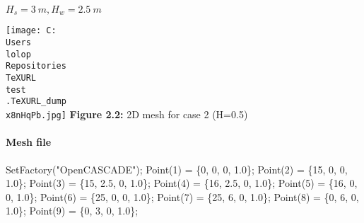 \documentclass[11pt]{article}
\newenvironment{Shaded}{}{}
\newcommand{\DecValTok}[1]{\textcolor[rgb]{0.25,0.63,0.44}{{#1}}}
\newcommand{\FloatTok}[1]{\textcolor[rgb]{0.25,0.63,0.44}{{#1}}}
\newcommand{\StringTok}[1]{\textcolor[rgb]{0.25,0.44,0.63}{{#1}}}
\newcommand{\NormalTok}[1]{{#1}}
\newcommand{\OperatorTok}[1]{\textcolor[rgb]{0.40,0.40,0.40}{{#1}}}
\begin{document}
\(H_s = 3\ m, H_w = 2.5\ m\)

\texttt{[image: C:\\Users\\lolop\\Repositories\\TeXURL\\test\\.TeXURL\_dump\\x8nHqPb.jpg]} \textbf{Figure 2.2:}
2D mesh for case 2 (H=0.5)

\hypertarget{mesh-file-1}{%
\paragraph{Mesh file}\label{mesh-file-1}}

\begin{Shaded}
\begin{Highlighting}[]
\NormalTok{SetFactory}\OperatorTok{(}\StringTok{"OpenCASCADE"}\OperatorTok{);}
\NormalTok{Point}\OperatorTok{(}\DecValTok{1}\OperatorTok{)} \OperatorTok{=} \OperatorTok{\{}\DecValTok{0}\OperatorTok{,} \DecValTok{0}\OperatorTok{,} \DecValTok{0}\OperatorTok{,} \FloatTok{1.0}\OperatorTok{\};}
\NormalTok{Point}\OperatorTok{(}\DecValTok{2}\OperatorTok{)} \OperatorTok{=} \OperatorTok{\{}\DecValTok{15}\OperatorTok{,} \DecValTok{0}\OperatorTok{,} \DecValTok{0}\OperatorTok{,} \FloatTok{1.0}\OperatorTok{\};}
\NormalTok{Point}\OperatorTok{(}\DecValTok{3}\OperatorTok{)} \OperatorTok{=} \OperatorTok{\{}\DecValTok{15}\OperatorTok{,} \FloatTok{2.5}\OperatorTok{,} \DecValTok{0}\OperatorTok{,} \FloatTok{1.0}\OperatorTok{\};}
\NormalTok{Point}\OperatorTok{(}\DecValTok{4}\OperatorTok{)} \OperatorTok{=} \OperatorTok{\{}\DecValTok{16}\OperatorTok{,} \FloatTok{2.5}\OperatorTok{,} \DecValTok{0}\OperatorTok{,} \FloatTok{1.0}\OperatorTok{\};}
\NormalTok{Point}\OperatorTok{(}\DecValTok{5}\OperatorTok{)} \OperatorTok{=} \OperatorTok{\{}\DecValTok{16}\OperatorTok{,} \DecValTok{0}\OperatorTok{,} \DecValTok{0}\OperatorTok{,} \FloatTok{1.0}\OperatorTok{\};}
\NormalTok{Point}\OperatorTok{(}\DecValTok{6}\OperatorTok{)} \OperatorTok{=} \OperatorTok{\{}\DecValTok{25}\OperatorTok{,} \DecValTok{0}\OperatorTok{,} \DecValTok{0}\OperatorTok{,} \FloatTok{1.0}\OperatorTok{\};}
\NormalTok{Point}\OperatorTok{(}\DecValTok{7}\OperatorTok{)} \OperatorTok{=} \OperatorTok{\{}\DecValTok{25}\OperatorTok{,} \DecValTok{6}\OperatorTok{,} \DecValTok{0}\OperatorTok{,} \FloatTok{1.0}\OperatorTok{\};}
\NormalTok{Point}\OperatorTok{(}\DecValTok{8}\OperatorTok{)} \OperatorTok{=} \OperatorTok{\{}\DecValTok{0}\OperatorTok{,} \DecValTok{6}\OperatorTok{,} \DecValTok{0}\OperatorTok{,} \FloatTok{1.0}\OperatorTok{\};}
\NormalTok{Point}\OperatorTok{(}\DecValTok{9}\OperatorTok{)} \OperatorTok{=} \OperatorTok{\{}\DecValTok{0}\OperatorTok{,} \DecValTok{3}\OperatorTok{,} \DecValTok{0}\OperatorTok{,} \FloatTok{1.0}\OperatorTok{\};}

\end{Highlighting}
\end{Shaded}
\end{document}
